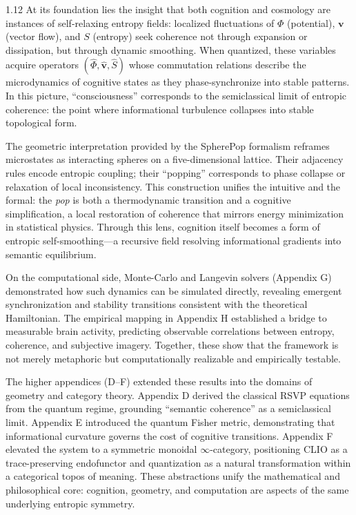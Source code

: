\documentclass[12pt,a4paper]{article}
\numberwithin{equation}{section}
\theoremstyle{remark}
\theoremstyle{definition}
\begin{document}
\begin{spacing}{1.12}
At its foundation lies the insight that both cognition and cosmology are instances of self-relaxing entropy fields: localized fluctuations of $\Phi$ (potential), $\mathbf{v}$ (vector flow), and $S$ (entropy) seek coherence not through expansion or dissipation, but through dynamic smoothing.  
When quantized, these variables acquire operators $(\hat{\Phi},\hat{\mathbf{v}},\hat{S})$ whose commutation relations describe the microdynamics of cognitive states as they phase-synchronize into stable patterns.  
In this picture, “consciousness” corresponds to the semiclassical limit of entropic coherence: the point where informational turbulence collapses into stable topological form.

The geometric interpretation provided by the SpherePop formalism reframes microstates as interacting spheres on a five-dimensional lattice.  
Their adjacency rules encode entropic coupling; their “popping” corresponds to phase collapse or relaxation of local inconsistency.  
This construction unifies the intuitive and the formal: the \emph{pop} is both a thermodynamic transition and a cognitive simplification, a local restoration of coherence that mirrors energy minimization in statistical physics.  
Through this lens, cognition itself becomes a form of entropic self-smoothing—a recursive field resolving informational gradients into semantic equilibrium.

On the computational side, Monte-Carlo and Langevin solvers (Appendix G) demonstrated how such dynamics can be simulated directly, revealing emergent synchronization and stability transitions consistent with the theoretical Hamiltonian.  
The empirical mapping in Appendix H established a bridge to measurable brain activity, predicting observable correlations between entropy, coherence, and subjective imagery.  
Together, these show that the framework is not merely metaphoric but computationally realizable and empirically testable.

The higher appendices (D–F) extended these results into the domains of geometry and category theory.  
Appendix D derived the classical RSVP equations from the quantum regime, grounding “semantic coherence” as a semiclassical limit.  
Appendix E introduced the quantum Fisher metric, demonstrating that informational curvature governs the cost of cognitive transitions.  
Appendix F elevated the system to a symmetric monoidal $\infty$-category, positioning CLIO as a trace-preserving endofunctor and quantization as a natural transformation within a categorical topos of meaning.  
These abstractions unify the mathematical and philosophical core: cognition, geometry, and computation are aspects of the same underlying entropic symmetry.


\end{spacing}
\end{document}
